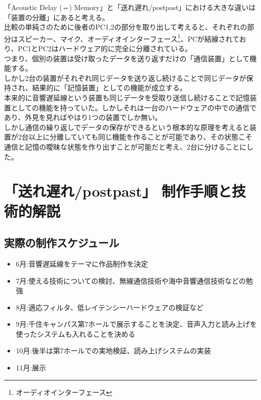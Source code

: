 「Acoustic Delay (⇔)
Memory」と「送れ\textbar{}遅れ/post\textbar{}past」における大きな違いは「装置の分離」にあると考える。\\
比較の単純さのために後者のPC1,2の部分を取り出して考えると、それぞれの部分はスピーカー、マイク、オーディオインターフェース\footnote{オーディオインターフェース}、PCが結線されており、PC1とPC2はハードウェア的に完全に分離されている。\\
つまり、個別の装置は受け取ったデータを送り返すだけの「通信装置」として機能する。\\
しかし2台の装置がそれぞれ同じデータを送り返し続けることで同じデータが保持され、結果的に「記憶装置」としての機能が成立する。\\
本来的に音響遅延線という装置も同じデータを受取り送信し続けることで記憶装置としての機能を持っていた。しかしそれは一台のハードウェアの中での通信であり、外見を見ればやはり1つの装置でしか無い。\\
しかし通信の繰り返しでデータの保存ができるという根本的な原理を考えると装置が2台以上に分離していても同じ機能を作ることが可能であり、その状態こそ通信と記憶の曖昧な状態を作り出すことが可能だと考え、2台に分けることにした。

\chapter{「送れ\textbar{}遅れ/post\textbar{}past」
制作手順と技術的解説}\label{ux9001ux308cux9045ux308cpostpast-ux5236ux4f5cux624bux9806ux3068ux6280ux8853ux7684ux89e3ux8aac}

\section{実際の制作スケジュール}\label{ux5b9fux969bux306eux5236ux4f5cux30b9ux30b1ux30b8ux30e5ux30fcux30eb}

\begin{itemize}
\tightlist
\item
  6月:音響遅延線をテーマに作品制作を決定
\item
  7月:使える技術についての検討、無線通信技術や海中音響通信技術などの勉強
\item
  8月:適応フィルタ、低レイテンシーハードウェアの検証など
\item
  9月:千住キャンパス第7ホールで展示することを決定、音声入力と読み上げを使ったシステムも入れることを決める
\item
  10月:後半は第7ホールでの実地検証、読み上げシステムの実装
\item
  11月:展示
\end{itemize}


